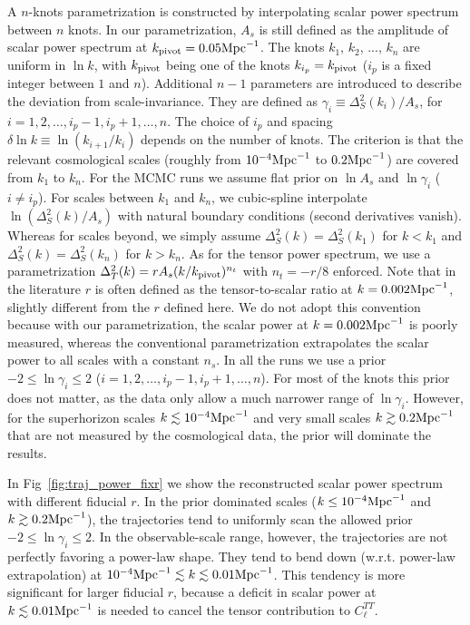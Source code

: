 \documentclass[a4paper,11pt]{article}
\begin{document}
A $n$-knots parametrization is constructed by interpolating scalar power spectrum between $n$ knots. In our parametrization,  $A_s$ is still defined as the amplitude of scalar power spectrum at $k_{\rm pivot}=0.05 {\rm Mpc}^{-1}$. The knots $k_1$, $k_2$, ..., $k_n$ are uniform in $\ln k$, with $k_{\rm pivot}$ being one of the knots $k_{i_p} = k_{\rm pivot}$ ($i_p$ is a fixed integer between $1$ and $n$). Additional $n-1$ parameters are introduced to describe the deviation from scale-invariance. They are defined as $\gamma_i\equiv \Delta^2_S(k_i)/ A_s$, for $i = 1, 2, \ldots, i_p - 1, i_p+1, \ldots, n$.  The choice of $i_p$ and spacing $\delta\ln k \equiv \ln (k_{i+1}/k_i)$ depends on the number of knots. The criterion is that the relevant cosmological scales (roughly from $10^{-4}{\rm Mpc}^{-1}$ to $0.2 {\rm Mpc}^{-1}$) are covered from $k_1$ to $k_n$. For the MCMC runs we assume flat prior on $\ln A_s$ and $\ln \gamma_i$ ($i\neq i_p$). For scales between $k_1$ and $k_n$, we cubic-spline interpolate $\ln (\Delta^2_S(k)/A_s)$ with natural boundary conditions (second derivatives vanish). Whereas for scales beyond, we simply assume $\Delta^2_S(k) = \Delta^2_S(k_1)$ for $k<k_1$ and $\Delta^2_S(k) = \Delta^2_S(k_n)$ for $k>k_n$. As for the tensor power spectrum, we use a parametrization $\Delta^2_T(k) = r A_s (k/k_{\rm pivot})^{n_t}$ with $n_t = -r/8$ enforced. Note that in the literature $r$ is often defined as the tensor-to-scalar ratio at $k=0.002 {\rm Mpc}^{-1}$, slightly different from the $r$ defined here. We do not adopt this convention because with our parametrization, the scalar power at $k=0.002 {\rm Mpc}^{-1}$ is poorly measured, whereas the conventional parametrization extrapolates the scalar power to all scales with a constant $n_s$. In all the runs we use a prior $-2 \le \ln \gamma_i \le 2$ ($i = 1, 2, \ldots, i_p - 1, i_p+1, \ldots, n$). For most of the knots this prior does not matter, as the data only allow a much narrower range of $\ln \gamma_i$. However, for the superhorizon scales $k\lesssim 10^{-4} {\rm Mpc}^{-1}$ and very small scales $k\gtrsim 0.2 {\rm Mpc}^{-1}$ that are not measured by the cosmological data, the prior will dominate the results. 

In Fig~\ref{fig:traj_power_fixr} we show the reconstructed scalar power spectrum with different fiducial $r$. In the prior dominated scales ($k\le 10^{-4} {\rm Mpc}^{-1}$ and $k\gtrsim 0.2 {\rm Mpc}^{-1}$), the trajectories tend to uniformly scan the allowed prior $-2\le \ln \gamma_i\le 2$. In the observable-scale range, however, the trajectories are not perfectly favoring a power-law shape. They tend to bend down (w.r.t. power-law extrapolation) at $10^{-4} {\rm Mpc}^{-1} \lesssim k \lesssim 0.01 {\rm Mpc}^{-1}$. This tendency is more significant for larger fiducial $r$, because a deficit in scalar power at $k\lesssim 0.01 {\rm Mpc}^{-1}$ is needed to cancel the tensor contribution to $C_\ell^{TT}$. 
\end{document}
